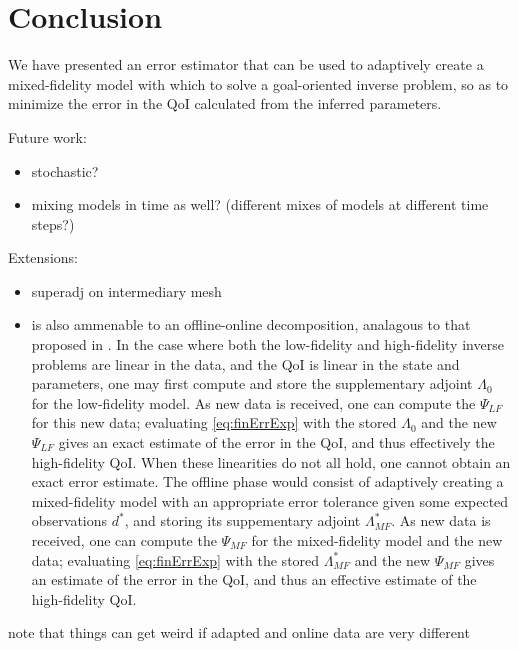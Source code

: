 \section{Conclusion}\label{sect:conc}

We have presented an error estimator that can be used to adaptively create a mixed-fidelity model with which to solve a goal-oriented inverse problem, so as to minimize the error in the QoI calculated from the inferred parameters. 

Future work:
\begin{itemize}
\item stochastic?
\item mixing models in time as well? (different mixes of models at different time steps?)
\end{itemize}

Extensions:
\begin{itemize}
\item superadj on intermediary mesh
\item {} is also ammenable to an offline-online decomposition, analagous to that proposed in \cite{LiebWill13}. In the case where both the low-fidelity and high-fidelity inverse problems are linear in the data, and the QoI is linear in the state and parameters, one may first compute and store the supplementary adjoint $\Lambda_0$ for the low-fidelity model. As new data is received, one can compute the $\Psi_{LF}$ for this new data; evaluating \cref{eq:finErrExp} with the stored $\Lambda_0$ and the new $\Psi_{LF}$ gives an exact estimate of the error in the QoI, and thus effectively the high-fidelity QoI. When these linearities do not all hold, one cannot obtain an exact error estimate. The offline phase would consist of adaptively creating a mixed-fidelity model with an appropriate error tolerance given some expected observations $d^*$, and storing its suppementary adjoint $\Lambda_{MF}^*$. As new data is received, one can compute the $\Psi_{MF}$ for the mixed-fidelity model and the new data; evaluating \cref{eq:finErrExp} with the stored $\Lambda_{MF}^*$ and the new $\Psi_{MF}$ gives an estimate of the error in the QoI, and thus an effective estimate of the high-fidelity QoI. 
\end{itemize}

note that things can get weird if adapted and online data are very different
